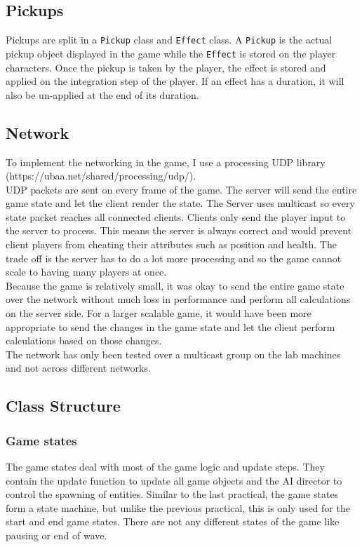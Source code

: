 \documentclass{article}
\newcommand{\n}[0]{\\[\baselineskip]}
\begin{document}
\subsection{Pickups}
Pickups are split in a \texttt{Pickup} class and \texttt{Effect} class. A \texttt{Pickup} is the actual pickup object displayed in the game while the \texttt{Effect} is stored on the player characters. Once the pickup is taken by the player, the effect is stored and applied on the integration step of the player. If an effect has a duration, it will also be un-applied at the end of its duration. 

\subsection{Network}
To implement the networking in the game, I use a processing UDP library (https://ubaa.net/shared/processing/udp/).
\n
UDP packets are sent on every frame of the game. The server will send the entire game state and let the client render the state. The Server uses multicast so every state packet reaches all connected clients. Clients only send the player input to the server to process. This means the server is always correct and would prevent client players from cheating their attributes such as position and health. The trade off is the server has to do a lot more processing and so the game cannot scale to having many players at once.
\n
Because the game is relatively small, it was okay to send the entire game state over the network without much loss in performance and perform all calculations on the server side. For a larger scalable game, it would have been more appropriate to send the changes in the game state and let the client perform calculations based on those changes.
\n
The network has only been tested over a multicast group on the lab machines and not across different networks.

\subsection{Class Structure}

\subsubsection{Game states}
The game states deal with most of the game logic and update steps. They contain the update function to update all game objects and the AI director to control the spawning of entities. Similar to the last practical, the game states form a state machine, but unlike the previous practical, this is only used for the start and end game states. There are not any different states of the game like pausing or end of wave.
\end{document}
